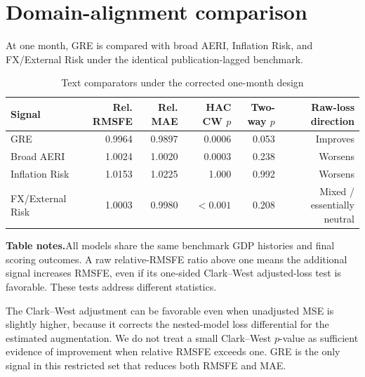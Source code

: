 \documentclass[12pt]{article}
\newcommand{\TableNote}[1]{%
  \par\vspace{0.65ex}\noindent
  \begin{minipage}{0.97\linewidth}\footnotesize\singlespacing\raggedright
  \textbf{Table notes.}\enspace #1
  \end{minipage}}
\begin{document}
\section{Domain-alignment comparison}
At one month, GRE is compared with broad AERI, Inflation Risk, and FX/External Risk under the identical publication-lagged benchmark.
\begin{table}[htbp]
\centering\scriptsize
\caption{Text comparators under the corrected one-month design}
\begin{tabular}{lrrrrr}
\toprule
Signal & Rel. RMSFE & Rel. MAE & HAC CW $p$ & Two-way $p$ & Raw-loss direction\\
\midrule
GRE & 0.9964 & 0.9897 & 0.0006 & 0.053 & Improves\\
Broad AERI & 1.0024 & 1.0020 & 0.0003 & 0.238 & Worsens\\
Inflation Risk & 1.0153 & 1.0225 & 1.000 & 0.992 & Worsens\\
FX/External Risk & 1.0003 & 0.9980 & $<0.001$ & 0.208 & Mixed / essentially neutral\\
\bottomrule
\end{tabular}
\TableNote{All models share the same benchmark GDP histories and final scoring outcomes. A raw relative-RMSFE ratio above one means the additional signal increases RMSFE, even if its one-sided Clark--West adjusted-loss test is favorable. These tests address different statistics.}
\end{table}

The Clark--West adjustment can be favorable even when unadjusted MSE is slightly higher, because it corrects the nested-model loss differential for the estimated augmentation. We do not treat a small Clark--West $p$-value as sufficient evidence of improvement when relative RMSFE exceeds one. GRE is the only signal in this restricted set that reduces both RMSFE and MAE.
\end{document}
